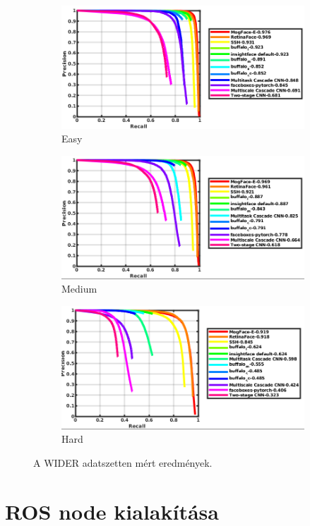 \begin{figure}
    \centering
    \begin{subfigure}[b]{0.75\linewidth}
        \includegraphics[width=\linewidth]{figures/wider_easy.png}
        \caption{Easy}
    \end{subfigure}
    \begin{subfigure}[b]{0.75\linewidth}
        \includegraphics[width=\linewidth]{figures/wider_medium.png}
        \caption{Medium}
    \end{subfigure}
    \begin{subfigure}[b]{0.75\linewidth}
        \includegraphics[width=\linewidth]{figures/wider_hard.png}
        \caption{Hard}
    \end{subfigure}
    \caption{A WIDER adatszetten mért eredmények.}
    \label{fig:wider_evaluation}
\end{figure}

\section{ROS node kialakítása}